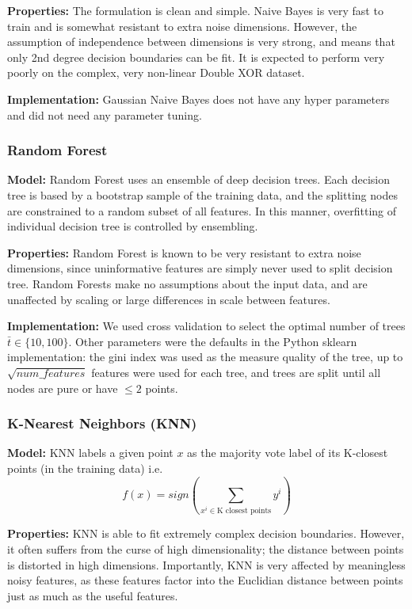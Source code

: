 \documentclass{article}
\begin{document}
\textbf{Properties:}
The formulation is clean and simple. Naive Bayes is very fast to train and is
somewhat resistant to extra noise dimensions. However, the assumption of
independence between dimensions is very strong, and means that only 2nd degree
decision boundaries can be fit. It is expected to perform very poorly on the
complex, very non-linear Double XOR dataset.

\textbf{Implementation:}
Gaussian Naive Bayes does not have any hyper parameters and did not need any
parameter tuning.

\subsubsection*{Random Forest}
\textbf{Model:}
Random Forest uses an ensemble of deep decision trees.  Each decision tree is
based by a bootstrap sample of the training data, and the splitting nodes are
constrained to a random subset of all features. In this manner, overfitting of
individual decision tree is controlled by ensembling.

\textbf{Properties:}
Random Forest is known to be very resistant to extra noise dimensions, since
uninformative features are simply never used to split decision tree. Random
Forests make no assumptions about the input data, and are unaffected by scaling
or large differences in scale between features.

\textbf{Implementation:}
We used cross validation to select the optimal number of trees $\bar{t} \in
\{10, 100\}$. Other parameters were the defaults in the Python sklearn
implementation: the gini index was used as the measure quality of the tree, up
to $\sqrt{num\_features}$ features were used for each tree, and trees are split
until all nodes are pure or have $\leq 2$ points.


\subsubsection*{K-Nearest Neighbors (KNN)}
\textbf{Model:}
KNN labels a given point $x$ as the majority vote label of its K-closest points
(in the training data) i.e. $$f(x) = sign(\sum_{x^i \in \text{K closest
        points}} y^i) $$

\textbf{Properties:}
KNN is able to fit extremely complex decision boundaries. However, it often
suffers from the curse of high dimensionality; the distance between points is
distorted in high dimensions. Importantly, KNN is very affected by meaningless
noisy features, as these features factor into the Euclidian distance between
points just as much as the useful features.
\end{document}
